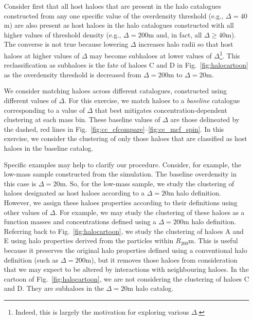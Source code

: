 \documentclass[usenatbib,fleqn]{mnras}
\begin{document}
Consider first that all host haloes that are present in the halo catalogues constructed from any one specific value of the overdensity threshold (e.g., $\Delta=40$m) are also present as host haloes in the halo catalogues constructed with all higher values of threshold density (e.g., $\Delta=200$m and, in fact, all $\Delta \ge 40$m). The converse is not true because lowering $\Delta$ increases halo radii so that host haloes at higher values of $\Delta$ may become subhaloes at lower values of $\Delta$\footnote{Indeed, this is largely the motivation for exploring various $\Delta$.}. This reclassification as subhaloes is the fate of haloes C and D in Fig.~\ref{fig:halocartoon} as the overdensity threshold is decreased from $\Delta=200$m to $\Delta=20$m. 

We consider matching haloes across different catalogues, constructed using different values of $\Delta$. For this exercise, we match haloes to a {\em baseline} catalogue corresponding to a value of $\Delta$ that best mitigates concentration-dependent clustering at each mass bin. These baseline values of $\Delta$ are those delineated by the dashed, red lines in Fig.~\ref{fig:cc_cfcompare}--\ref{fig:cc_mcf_spin}. In this exercise, we consider the clustering of only those haloes that are classified as host haloes in the baseline catalog. 

Specific examples may help to clarify our procedure. Consider, for example, the low-mass sample constructed from the \simA{} simulation. The baseline overdensity in this case is $\Delta=20$m. So, for the low-mass sample, we study the clustering of haloes designated as host haloes according to a $\Delta=20$m halo definition. However, we assign these haloes properties according to their definitions using other values of $\Delta$. For example, we may study the clustering of these haloes as a function masses and concentrations defined using a $\Delta=200$m halo definition. Referring back to Fig.~\ref{fig:halocartoon}, we study the clustering of haloes A and E using halo properties derived from the particles within $R_{200}$m. This is useful because it preserves the original halo properties defined using a conventional halo definition (such as $\Delta=200$m), but it removes those haloes from consideration that we may expect to be altered by interactions with neighbouring haloes. In the cartoon of Fig.~\ref{fig:halocartoon}, we are not considering the clustering of haloes C and D. They are subhaloes in the $\Delta=20$m halo catalog. 
\end{document}

